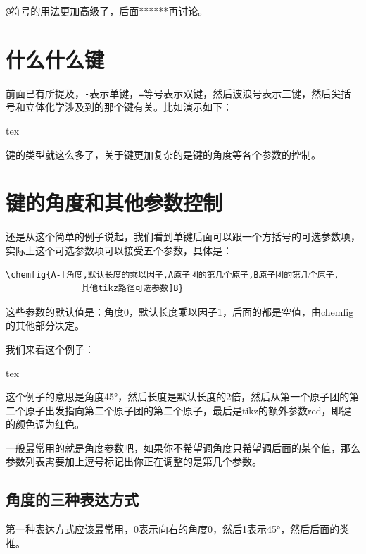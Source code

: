 \documentclass[11pt,oneside]{book}
\begin{document}
\verb+@+\@{}符号的用法更加高级了，后面******再讨论。

\section{什么什么键}
\label{sec:什么什么键}
前面已有所提及，\verb+-+表示单键，\verb+=+等号表示双键，然后波浪号表示三键，然后尖括号和立体化学涉及到的那个键有关。比如演示如下：
\begin{tcbcode}{tex}
\end{tcbcode}








键的类型就这么多了，关于键更加复杂的是键的角度等各个参数的控制。

\section{键的角度和其他参数控制}
还是从这个简单的例子说起，我们看到单键后面可以跟一个方括号的可选参数项，实际上这个可选参数项可以接受五个参数，具体是：
\begin{Verbatim}
\chemfig{A-[角度,默认长度的乘以因子,A原子团的第几个原子,B原子团的第几个原子,
               其他tikz路径可选参数]B}
\end{Verbatim}

这些参数的默认值是：角度0，默认长度乘以因子1，后面的都是空值，由chemfig的其他部分决定。

我们来看这个例子：
\begin{tcbcode}[]{tex}
\end{tcbcode}


这个例子的意思是角度45\si{\degree}，然后长度是默认长度的2倍，然后从第一个原子团的第二个原子出发指向第二个原子团的第二个原子，最后是tikz的额外参数red，即键的颜色调为红色。

一般最常用的就是角度参数吧，如果你不希望调角度只希望调后面的某个值，那么参数列表需要加上逗号标记出你正在调整的是第几个参数。

\subsection{角度的三种表达方式}
第一种表达方式应该最常用，0表示向右的角度0，然后1表示45\si{\degree}，然后后面的类推。
\end{document}
